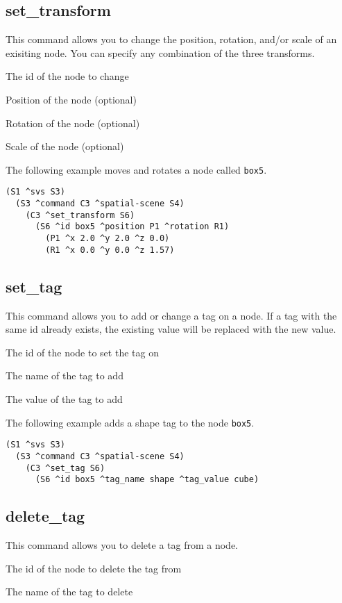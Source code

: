 \subsection{set\_transform}
This command allows you to change the position, rotation, and/or scale of an 
exisiting node. You can specify any combination of the three transforms. 
\begin{description}
  \item{} The id of the node to change
  \item{} Position of the node (optional)
  \item{} Rotation of the node (optional)
  \item{} Scale of the node (optional)
\end{description}

The following example moves and rotates a node called \texttt{box5}.
\begin{verbatim}
(S1 ^svs S3)
  (S3 ^command C3 ^spatial-scene S4)
    (C3 ^set_transform S6)
      (S6 ^id box5 ^position P1 ^rotation R1)
        (P1 ^x 2.0 ^y 2.0 ^z 0.0)
        (R1 ^x 0.0 ^y 0.0 ^z 1.57)
\end{verbatim}

\subsection{set\_tag}
This command allows you to add or change a tag on a node.
If a tag with the same id already exists, 
the existing value will be replaced with the new value.
\begin{description}
  \item{} The id of the node to set the tag on
  \item{} The name of the tag to add
  \item{} The value of the tag to add
\end{description}

The following example adds a shape tag to the node \texttt{box5}.
\begin{verbatim}
(S1 ^svs S3)
  (S3 ^command C3 ^spatial-scene S4)
    (C3 ^set_tag S6)
      (S6 ^id box5 ^tag_name shape ^tag_value cube)
\end{verbatim}

\subsection{delete\_tag}
This command allows you to delete a tag from a node.
\begin{description}
  \item{} The id of the node to delete the tag from
  \item{} The name of the tag to delete
\end{description}


